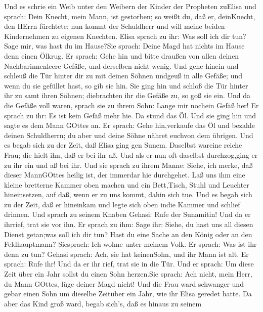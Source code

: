  Und es schrie ein Weib unter den Weibern der Kinder der
Propheten zuElisa und sprach: Dein Knecht, mein Mann, ist gestorben; so
weißt du, daß er, deinKnecht, den HErrn fürchtete; nun kommt der
Schuldherr und will meine beiden Kindernehmen zu eigenen Knechten.
 Elisa sprach zu ihr: Was soll ich dir tun? Sage mir, was
hast du im Hause?Sie sprach: Deine Magd hat nichts im Hause denn einen
Ölkrug.  Er sprach: Gehe hin und bitte draußen von allen
deinen Nachbarinnenleere Gefäße, und derselben nicht wenig. 
Und gehe hinein und schleuß die Tür hinter dir zu mit deinen Söhnen
undgeuß in alle Gefäße; und wenn du sie gefüllet hast, so gib sie hin.
 Sie ging hin und schloß die Tür hinter ihr zu samt ihren
Söhnen; diebrachten ihr die Gefäße zu, so goß sie ein.  Und
da die Gefäße voll waren, sprach sie zu ihrem Sohn: Lange mir nochein
Gefäß her! Er sprach zu ihr: Es ist kein Gefäß mehr hie. Da stund das
Öl.  Und sie ging hin und sagte es dem Mann GOttes an. Er
sprach: Gehe hin,verkaufe das Öl und bezahle deinen Schuldherrn; du aber
und deine Söhne nähret euchvon dem übrigen.  Und es begab
sich zu der Zeit, daß Elisa ging gen Sunem. Daselbst wareine reiche
Frau; die hielt ihn, daß er bei ihr aß. Und als er nun oft daselbst
durchzog,ging er zu ihr ein und aß bei ihr.  Und sie sprach
zu ihrem Manne: Siehe, ich merke, daß dieser MannGOttes heilig ist, der
immerdar hie durchgehet.  Laß uns ihm eine kleine bretterne
Kammer oben machen und ein Bett,Tisch, Stuhl und Leuchter hineinsetzen,
auf daß, wenn er zu uns kommt, dahin sich tue.  Und es
begab sich zu der Zeit, daß er hineinkam und legte sich oben indie
Kammer und schlief drinnen.  Und sprach zu seinem Knaben
Gehasi: Rufe der Sunamitin! Und da er ihrrief, trat sie vor ihn.
 Er sprach zu ihm: Sage ihr: Siehe, du hast uns all diesen
Dienst getan;was soll ich dir tun? Hast du eine Sache an den König oder
an den Feldhauptmann? Siesprach: Ich wohne unter meinem Volk.
 Er sprach: Was ist ihr denn zu tun? Gehasi sprach: Ach,
sie hat keinenSohn, und ihr Mann ist alt.  Er sprach: Rufe
ihr! Und da er ihr rief, trat sie in die Tür.  Und er
sprach: Um diese Zeit über ein Jahr sollst du einen Sohn herzen.Sie
sprach: Ach nicht, mein Herr, du Mann GOttes, lüge deiner Magd nicht!
 Und die Frau ward schwanger und gebar einen Sohn um
dieselbe Zeitüber ein Jahr, wie ihr Elisa geredet hatte. 
Da aber das Kind groß ward, begab sich's, daß es hinaus zu seinem
